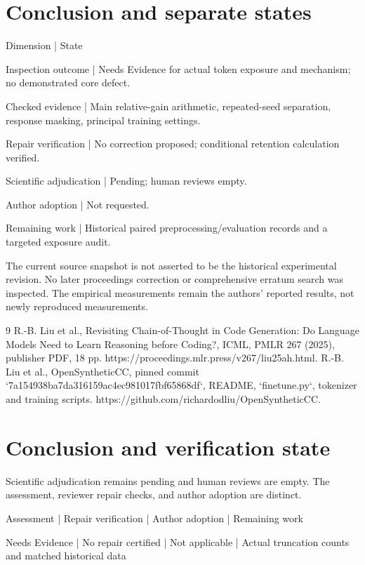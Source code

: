 \documentclass[10pt]{article}
\begin{document}
\section*{Conclusion and separate states}
Dimension | State\par
Inspection outcome | Needs Evidence for actual token exposure and mechanism; no demonstrated core defect.\par
Checked evidence | Main relative-gain arithmetic, repeated-seed separation, response masking, principal training settings.\par
Repair verification | No correction proposed; conditional retention calculation verified.\par
Scientific adjudication | Pending; human reviews empty.\par
Author adoption | Not requested.\par
Remaining work | Historical paired preprocessing/evaluation records and a targeted exposure audit.\par
The current source snapshot is not asserted to be the historical experimental revision. No later proceedings correction or comprehensive erratum search was inspected. The empirical measurements remain the authors’ reported results, not newly reproduced measurements.\par
9 R.-B. Liu et al., Revisiting Chain-of-Thought in Code Generation: Do Language Models Need to Learn Reasoning before Coding?, ICML, PMLR 267 (2025), publisher PDF, 18 pp. https://proceedings.mlr.press/v267/liu25ah.html. R.-B. Liu et al., OpenSyntheticCC, pinned commit `7a154938ba7da316159ac4ec981017fbf65868df`, README, `finetune.py`, tokenizer and training scripts. https://github.com/richardodliu/OpenSyntheticCC.\par
\section*{Conclusion and verification state}
Scientific adjudication remains pending and human reviews are empty. The assessment, reviewer repair checks, and author adoption are distinct.\par
Assessment | Repair verification | Author adoption | Remaining work\par
Needs Evidence | No repair certified | Not applicable | Actual truncation counts and matched historical data\par
\end{document}
